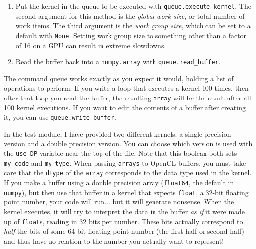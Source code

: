\documentclass[12pt,pdftex,letterpaper]{article}
\begin{document}
\begin{enumerate}
\item Put the kernel in the queue to be executed with \texttt{queue.execute\_kernel}.  The second argument for this method is the \textit{global work size}, or total number of work items.  The third argument is the \textit{work group size}, which can be set to a default with \texttt{None}.  Setting work group size to something other than a factor of 16 on a GPU can result in extreme slowdowns.

\item Read the buffer back into a \texttt{numpy.array} with \texttt{queue.read\_buffer}.
\end{enumerate}

The command queue works exactly as you expect it would, holding a list of operations to perform.  If you write a loop that executes a kernel 100 times, then after that loop you read the buffer, the resulting \texttt{array} will be the result after all 100 kernel executions.  If you want to edit the contents of a buffer after creating it, you can use \texttt{queue.write\_buffer}.

In the test module, I have provided two different kernels: a single precision version and a double precision version.  You can choose which version is used with the \texttt{use\_DP} variable near the top of the file.  Note that this boolean both sets \texttt{my\_code} and \texttt{my\_type}.  When passing \texttt{arrays} to OpenCL buffers, you must take care that the \texttt{dtype} of the \texttt{array} corresponds to the data type used in the kernel.  If you make a buffer using a double precision array (\texttt{float64}, the default in \texttt{numpy}), but then use that buffer in a kernel that expects \texttt{float}, a 32-bit floating point number, your code will run... but it will generate nonsense.  When the kernel executes, it will try to interpret the data in the buffer \textit{as if} it were made up of \texttt{float}s, reading in 32 bits per number.  These bits actually correspond to \textit{half} the bits of some 64-bit floating point number (the first half or second half) and thus have no relation to the number you actually want to represent!
\end{document}
